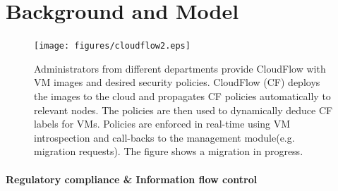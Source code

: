 \section{Background and Model}
\label{sec:model}

\begin{figure}[t]
\begin{center}
\texttt{[image: figures/cloudflow2.eps]}
\caption{\small 
% 
Administrators from different departments provide CloudFlow with VM images
and desired security policies.  CloudFlow (CF) deploys the images to the
cloud and propagates CF policies automatically to relevant nodes.  The
policies are then used to dynamically deduce CF labels for VMs.  Policies
are enforced in real-time using VM introspection and call-backs to the management module(e.g. 
migration requests).  The figure shows a migration in progress.
%
\label{cloudflow:figure:highlevelarch}}
\end{center}
\end{figure}


\paragraph{\bf Regulatory compliance \& Information flow control}


